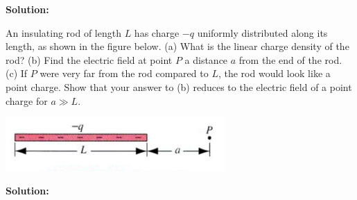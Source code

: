 \documentclass[11pt]{article}
\begin{document}
\textbf{Solution:}


\clearpage

\begin{problem}[\P (E26.18)]
An insulating rod of length $L$ has charge $-q$ uniformly distributed along its length, as shown in the figure below. (a) What is the linear charge density of the rod? (b) Find the electric
field at point $P$ a distance $a$ from the end of the rod. (c) If $P$ were very far from the rod compared to $L$, the rod would look like a point charge. Show that your answer to (b) reduces to the electric field of a point charge for $a \gg L$.
\begin{center}
\includegraphics[scale=0.75]{prob6.png}
\end{center}
\end{problem}


\textbf{Solution:}


\clearpage
\end{document}
